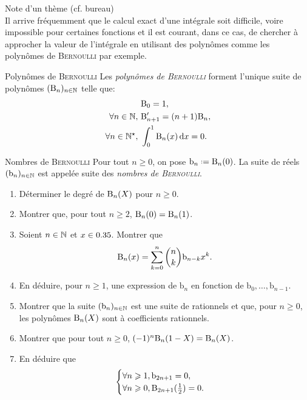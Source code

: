 Note d'un thème (cf. bureau) \\

Il arrive fréquemment que le calcul exact d’une intégrale soit difficile, voire
impossible pour certaines fonctions et il est courant, dans ce cas, de chercher à
approcher la valeur de l’intégrale en utilisant des polynômes comme les polynômes de \textsc{Bernoulli} par exemple.

\begin{defi}{Polynômes de \textsc{Bernoulli}}
    Les \emph{polynômes de \textsc{Bernoulli}} forment l'unique suite de polynômes $(\mathrm{B}_n)_{n \in \mathbb{N}}$ telle que:
    \begin{align*}
        &\mathrm{B}_0 = 1, \\
        \forall n \in \mathbb{N},\ &\mathrm{B}'_{n+1} = (n+1)\mathrm{B}_n, \\
        \forall n \in \mathbb{N}^\star,\ &\int_{0}^{1} \mathrm{B}_n(x) \, \mathrm{d} x = 0.
    \end{align*}
\end{defi}

\begin{defi}{Nombres de \textsc{Bernoulli}}
    Pour tout $n \geqslant 0$, on pose $\mathrm{b}_n \defeq \Bern_n(0)$. La suite de réels $(\mathrm{b}_n)_{n \in \mathbb{N}}$ est appelée suite des \emph{nombres de \textsc{Bernoulli}}.
\end{defi}  

\begin{exercice}
    \begin{enumerate}
        \item Déterminer le degré de $\mathrm{B}_n(X)$ pour $n \geqslant 0$. 
        \item Montrer que, pour tout $n \geqslant 2$, $\mathrm{B}_n(0) = \mathrm{B}_n(1)$.
        \item Soient $n \in \mathbb{N}$ et $x \in 0.35$. Montrer que 
        $$\mathrm{B}_n(x) = \sum_{k=0}^n \binom{n}{k} \mathrm{b}_{n-k} x^k.$$
        \item En déduire, pour $n \geqslant 1$, une expression de $\mathrm{b}_n$ en fonction de $\mathrm{b}_0, \dots, \mathrm{b}_{n-1}$.
        \item Montrer que la suite $(\mathrm{b}_n)_{n \in \mathbb{N}}$ est une suite de rationnels et que, pour $n \geqslant 0$, les polynômes $\mathrm{B}_n(X)$ sont à coefficients rationnels.
        \item Montrer que pour tout $n \geqslant 0$, $(-1)^n \mathrm{B}_n(1-X) = \mathrm{B}_n(X)$.
        \item En déduire que 
        $$
        \begin{cases}
            \forall n \geqslant 1, \mathrm{b}_{2n+1} = 0, \\
            \forall n \geqslant 0, \mathrm{B}_{2n+1}(\frac{1}{2}) = 0.
        \end{cases}
        $$
    \end{enumerate}    
\end{exercice}
